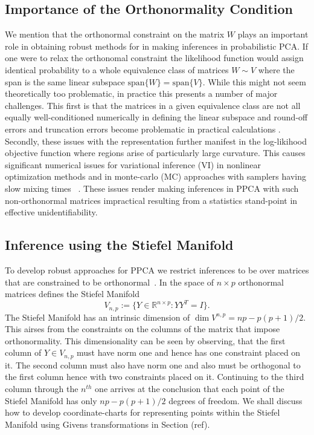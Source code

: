 \documentclass{article}
\begin{document}

\subsection{Importance of the Orthonormality Condition}
\label{orthonormal}
We mention that the orthonormal constraint on the matrix $W$ plays an important role in obtaining robust methods for
in making inferences in probabilistic PCA.  If one were to relax the orthonomal constraint the likelihood function would assign identical probability to a whole equivalence class of matrices $W \sim V$ where the span is the same linear subspace $\mbox{span}\{W\} = \mbox{span}\{V\}$.  While this might not seem theoretically too problematic, in practice this presents a number of major challenges.  This first is that the matrices in a given equivalence class are not all equally well-conditioned numerically in defining the linear subspace and round-off errors and truncation errors become problematic in practical calculations .  Secondly, these issues with the representation further manifest in the log-likihood objective function where regions arise of particularly large curvature.  This causes significant numerical issues for variational inference (VI) in nonlinear optimization methods and in monte-carlo (MC) approaches with samplers having slow mixing times~
\citet[chapt.~12.1.3]{murphy2012machine, mohamed2009bayesian,holbrook2016bayesian}.  These issues render making inferences in PPCA with such non-orthonormal matrices impractical resulting from a statistics stand-point in effective unidentifiability.

\subsection{Inference using the Stiefel Manifold}
To develop robust approaches for PPCA we restrict inferences to be over matrices that are constrained to be orthonormal~\citet[chapt.~12.1.3]{murphy2012machine}.  In the space of $n\times p$ orthonormal matrices defines the Stiefel Manifold~\citep{muirhead2009aspects}
\begin{equation}
V_{n,p} := \{Y \in \mathbb{R}^{n \times p}: YY^T = I \}.
\end{equation}
The Stiefel Manifold has an intrinsic dimension of $\dim{V^{n,p}} = np-p(p+1)/2$.  This airses from the constraints on the columns of the matrix that impose orthonormality.  This dimensionality can be seen by observing, that the first column of $Y \in V_{n,p}$ must have norm one and hence has one constraint placed on it. The second column must also have norm one and also must be orthogonal to the first column hence with two constraints placed on it.  Continuing to the third column through the $n^{th}$ one arrives at the conclusion that each point of the Stiefel Manifold has only $np-p(p+1)/2$ degrees of freedom.  We shall discuss how to develop coordinate-charts for  representing points within the Stiefel Manifold using Givens transformations in Section (ref).
\end{document}
